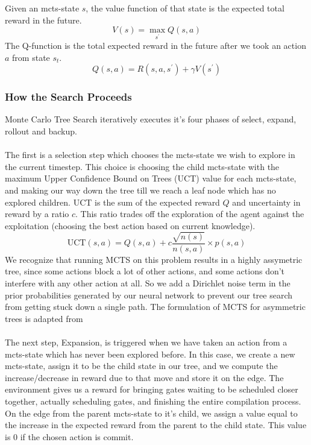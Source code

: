 \documentclass[%
 reprint,
 longbibliography,
 amsmath,amssymb,
 aps,
]{revtex4-2}
\begin{document}
Given an mcts-state $s$, the value function of that state is the expected total reward in the future.
\begin{equation}
    V(s) = \max_{s^\prime} Q(s, a)
\end{equation}
The Q-function is the total expected reward in the future after we took an action $a$ from state $s_t$.
\begin{equation}
    Q(s, a) = R(s, a, s^\prime) + \gamma V(s^\prime)
\end{equation}


\subsubsection{\label{sec:method-mcts-steps}How the Search Proceeds}

Monte Carlo Tree Search iteratively executes it's four phases of select, expand, rollout and backup.

\paragraph{} The first is a selection step which chooses the mcts-state we wish to explore in the current timestep. This choice is choosing the child mcts-state with the maximum Upper Confidence Bound on Trees (UCT) value for each mcts-state, and making our way down the tree till we reach a leaf node which has no explored children. UCT is the sum of the expected reward $Q$ and uncertainty in reward by a ratio $c$. This ratio trades off the exploration of the agent against the exploitation (choosing the best action based on current knowledge). 
\begin{equation}
    \textrm{UCT}(s, a) = Q(s, a) + c \frac{\sqrt{n(s)}}{n(s, a)} \times p(s, a)
\end{equation}
We recognize that running MCTS on this problem results in a highly assymetric tree, since some actions block a lot of other actions, and some actions don't interfere with any other action at all. So we add a Dirichlet noise term in the prior probabilities generated by our neural network to prevent our tree search from getting stuck down a single path. The formulation of MCTS for asymmetric trees is adapted from \citet{mcts_assymetric}

\paragraph{} The next step, Expansion, is triggered when we have taken an action from a mcts-state which has never been explored before. In this case, we create a new mcts-state, assign it to be the child state in our tree, and we compute the increase/decrease in reward due to that move and store it on the edge. The environment gives us a reward for bringing gates waiting to be scheduled closer together, actually scheduling gates, and finishing the entire compilation process. On the edge from the parent mcts-state to it's child, we assign a value equal to the increase in the expected reward from the parent to the child state. This value is 0 if the chosen action is commit.
\end{document}
